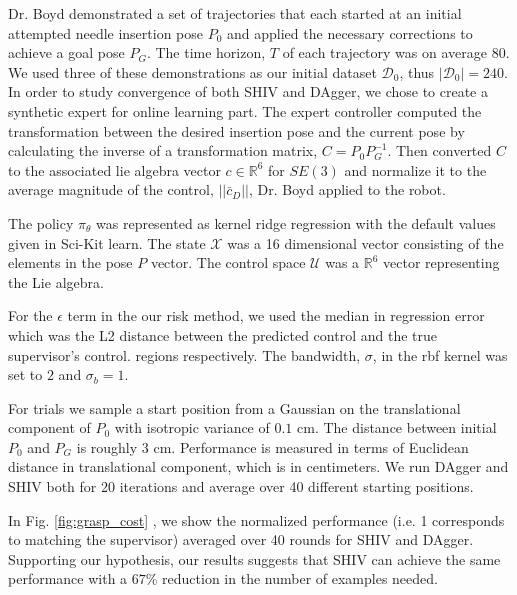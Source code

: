 \documentclass[10pt, conference]{ieeeconf}      %
\begin{document}
Dr. Boyd demonstrated a set of trajectories that each started at an initial attempted needle insertion pose $P_0$ and
applied the necessary corrections to achieve a goal pose $P_G$. The time horizon, $T$ of each trajectory was on average 80.  We used three of these demonstrations as our initial
dataset $\mathcal{D}_0$, thus $|\mathcal{D}_0| = 240$. In order to study convergence of both SHIV and DAgger, we chose to create a synthetic expert for online learning part. The expert controller computed the transformation between the desired insertion pose and the current pose  by calculating the inverse of a transformation matrix, $C = P_0P_G^{-1}$. Then converted $C$ to the associated lie algebra vector $c \in \mathbb{R}^6$ for $SE(3)$ and normalize it to the average magnitude of the control,  $||\bar{c}_D||$, Dr. Boyd applied to the robot. 

The policy $\pi_{\theta}$ was represented as kernel ridge regression with the default values given in Sci-Kit learn. The state $\mathcal{X}$ was  a 16 dimensional vector consisting of the elements in the pose $P$ vector. The control space $\mathcal{U}$ was a $\mathbb{R}^6$ vector representing the Lie algebra. 

For the $\epsilon$ term in the our risk method, we used the median in regression error which was the L2 distance between the predicted control and the true supervisor's control. 
regions respectively. The bandwidth, $\sigma$, in the rbf kernel was set to $2$ and $\sigma_b = 1$.

For trials we sample a start position from a Gaussian on the translational component of $P_0$ with isotropic variance of
$0.1$ cm. The distance between initial $P_0$ and $P_G$ is roughly $3$ cm. Performance is measured in
terms of Euclidean distance in translational component, which is in centimeters. We run DAgger and SHIV both for 20 iterations and average over 40 different starting positions.

 In Fig. \ref{fig:grasp_cost} , we show the normalized performance (i.e. 1 corresponds to matching the supervisor) averaged over 40 rounds for SHIV and DAgger. Supporting our hypothesis, our results suggests that SHIV can achieve the same performance with a $67\%$ reduction in the number of examples needed.
\end{document}
